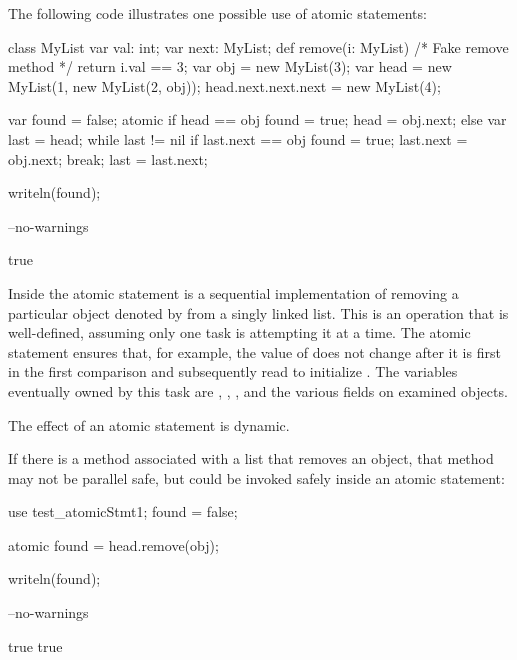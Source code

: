 \begin{example}
The following code illustrates one possible use of atomic statements:
\begin{chapelpre}
class MyList {
  var val: int;
  var next: MyList;
  def remove(i: MyList) {
    /* Fake remove method */
    return i.val == 3;
  }
}
var obj = new MyList(3);
var head = new MyList(1, new MyList(2, obj));
head.next.next.next = new MyList(4);
\end{chapelpre}
\begin{chapel}
var found = false;
atomic {
  if head == obj {
    found = true;
    head = obj.next;
  } else {
    var last = head;
    while last != nil {
      if last.next == obj {
        found = true;
        last.next = obj.next;
        break;
      }
      last = last.next;
    }
  }
}
\end{chapel}
\begin{chapelpost}
writeln(found);
\end{chapelpost}
\begin{chapelcompopts}
--no-warnings
\end{chapelcompopts}
\begin{chapeloutput}
true
\end{chapeloutput}
Inside the atomic statement is a sequential implementation of removing
a particular object denoted by  from a singly linked list.
This is an operation that is well-defined, assuming only one task is
attempting it at a time. The atomic statement ensures that, for
example, the value of  does not change after it is first in
the first comparison and subsequently read to
initialize . The variables eventually owned by this task
are , , , and the various 
fields on examined objects.
\end{example}

The effect of an atomic statement is dynamic.

\begin{example}
If there is a method associated with a list that removes an object,
that method may not be parallel safe, but could be invoked safely inside an
atomic statement:
\begin{chapelpre}
use test\_atomicStmt1;
found = false;
\end{chapelpre}
\begin{chapel}
atomic found = head.remove(obj);
\end{chapel}
\begin{chapelpost}
writeln(found);
\end{chapelpost}
\begin{chapelcompopts}
--no-warnings
\end{chapelcompopts}
\begin{chapeloutput}
true
true
\end{chapeloutput}
\end{example}

